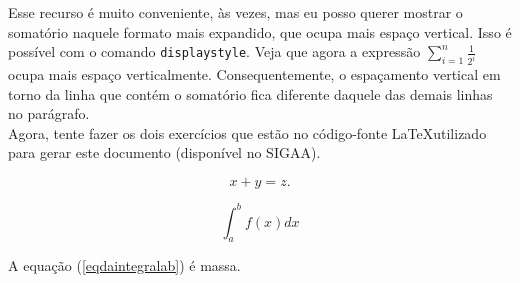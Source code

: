 \documentclass{article}
\begin{document}
Esse recurso é muito conveniente, às vezes, mas eu posso querer mostrar o somatório naquele formato mais expandido, que ocupa mais espaço vertical. Isso é possível com o comando \texttt{displaystyle}. Veja que agora a expressão $\displaystyle \sum_{i=1}^{n} \frac{1}{2^i}$ ocupa mais espaço verticalmente. Consequentemente, o espaçamento vertical em torno da linha que contém o somatório fica diferente daquele das demais linhas no parágrafo.\\

Agora, tente fazer os dois exercícios que estão no código-fonte \LaTeX utilizado para gerar este documento (disponível no SIGAA).

\begin{equation}
    x + y = z.
\end{equation}

\begin{equation}
\int_{a}^{b} f(x)dx \label{eqdaintegralab}
\end{equation}

A equação (\ref{eqdaintegralab}) é massa.
\end{document}
